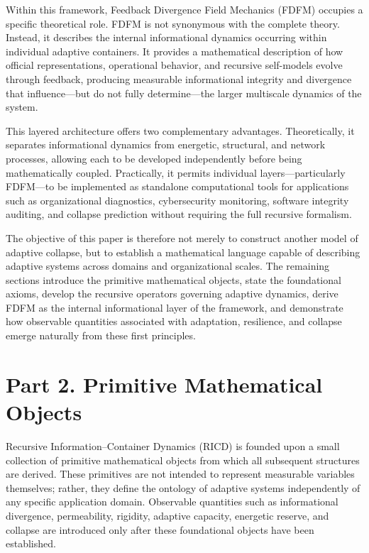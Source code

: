 \documentclass[
]{article}
\begin{document}
Within this framework, Feedback Divergence Field Mechanics (FDFM)
occupies a specific theoretical role. FDFM is not synonymous with the
complete theory. Instead, it describes the internal informational
dynamics occurring within individual adaptive containers. It provides a
mathematical description of how official representations, operational
behavior, and recursive self-models evolve through feedback, producing
measurable informational integrity and divergence that influence---but
do not fully determine---the larger multiscale dynamics of the system.

This layered architecture offers two complementary advantages.
Theoretically, it separates informational dynamics from energetic,
structural, and network processes, allowing each to be developed
independently before being mathematically coupled. Practically, it
permits individual layers---particularly FDFM---to be implemented as
standalone computational tools for applications such as organizational
diagnostics, cybersecurity monitoring, software integrity auditing, and
collapse prediction without requiring the full recursive formalism.

The objective of this paper is therefore not merely to construct another
model of adaptive collapse, but to establish a mathematical language
capable of describing adaptive systems across domains and organizational
scales. The remaining sections introduce the primitive mathematical
objects, state the foundational axioms, develop the recursive operators
governing adaptive dynamics, derive FDFM as the internal informational
layer of the framework, and demonstrate how observable quantities
associated with adaptation, resilience, and collapse emerge naturally
from these first principles.

\hypertarget{part-2.-primitive-mathematical-objects}{%
\section{Part 2. Primitive Mathematical
Objects}\label{part-2.-primitive-mathematical-objects}}

Recursive Information--Container Dynamics (RICD) is founded upon a small
collection of primitive mathematical objects from which all subsequent
structures are derived. These primitives are not intended to represent
measurable variables themselves; rather, they define the ontology of
adaptive systems independently of any specific application domain.
Observable quantities such as informational divergence, permeability,
rigidity, adaptive capacity, energetic reserve, and collapse are
introduced only after these foundational objects have been established.
\end{document}
